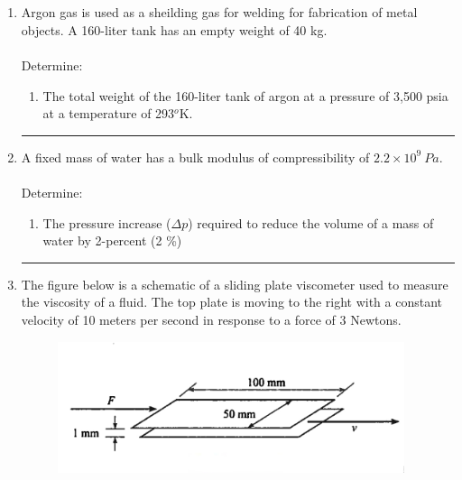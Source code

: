 \documentclass[12pt]{article}
\begin{document}
\section*{ }
\begin{enumerate}
\item Argon gas is used as a sheilding gas for welding for fabrication of metal objects. A 160-liter tank has an empty weight of 40 kg. \\ \\
Determine:
\begin{enumerate}
\item The total weight of the 160-liter tank of argon at a pressure of 3,500 psia at a temperature of 293$^o$K.  
\end{enumerate}
\noindent\rule{\linewidth}{0.4pt}
\item A fixed mass of water has a bulk modulus of compressibility of $2.2 \times 10^{9} ~Pa$. \\ \\
Determine:
\begin{enumerate}
\item The pressure increase ($\Delta p$) required to reduce the volume of a mass of water by 2-percent (2 \%)
\end{enumerate}
\noindent\rule{\linewidth}{0.4pt}
\item The figure below is a schematic of a sliding plate viscometer used to
measure the viscosity of a fluid. The top plate is moving to the right with a constant
velocity of 10 meters per second in response to a force of 3 Newtons. 

\begin{figure}[htbp] %
   \centering
   \includegraphics[width=4in]{SlidingPlateViscosity.png} 
   \caption{}
   \label{fig:slidingplateviscosity}
\end{figure}


\end{enumerate}
\end{document}
